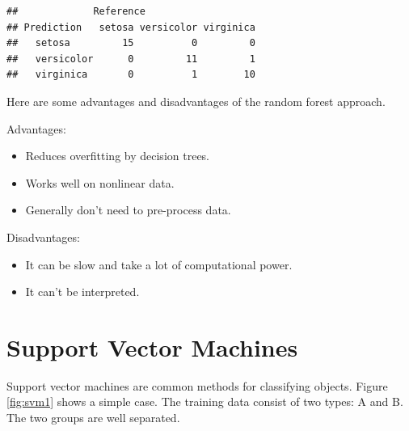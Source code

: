\documentclass[
]{book}
\newenvironment{Shaded}{\begin{snugshade}}{\end{snugshade}}
\newcommand{\AttributeTok}[1]{\textcolor[rgb]{0.13,0.29,0.53}{#1}}
\newcommand{\FunctionTok}[1]{\textcolor[rgb]{0.13,0.29,0.53}{\textbf{#1}}}
\newcommand{\NormalTok}[1]{#1}
\newcommand{\OtherTok}[1]{\textcolor[rgb]{0.56,0.35,0.01}{#1}}
\newcommand{\SpecialCharTok}[1]{\textcolor[rgb]{0.81,0.36,0.00}{\textbf{#1}}}
\theoremstyle{definition}
\theoremstyle{definition}
\theoremstyle{definition}
\theoremstyle{definition}
\theoremstyle{remark}
\begin{document}
\begin{Shaded}
\end{Shaded}

\begin{verbatim}
##             Reference
## Prediction   setosa versicolor virginica
##   setosa         15          0         0
##   versicolor      0         11         1
##   virginica       0          1        10
\end{verbatim}

Here are some advantages and disadvantages of the random forest approach.

Advantages:

\begin{itemize}
\item
  Reduces overfitting by decision trees.
\item
  Works well on nonlinear data.
\item
  Generally don't need to pre-process data.
\end{itemize}

Disadvantages:

\begin{itemize}
\item
  It can be slow and take a lot of computational power.
\item
  It can't be interpreted.
\end{itemize}

\section{Support Vector Machines}\label{support-vector-machines}

Support vector machines are common methods for classifying objects. Figure \ref{fig:svm1} shows a simple case. The training data consist of two types: A and B. The two groups are well separated.
\end{document}
